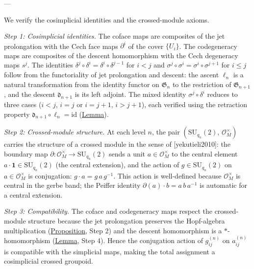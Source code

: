 \begin{proposition}
---

We verify the cosimplicial identities and the crossed-module axioms.

\emph{Step 1: Cosimplicial identities.}
The coface maps are composites of the jet prolongation with the
Cech face maps $\partial^i$ of the cover $\{U_i\}$.  The
codegeneracy maps are composites of the descent homomorphism with the
Cech degeneracy maps $s^j$.  The identities
$\delta^j \circ \delta^i = \delta^i \circ \delta^{j-1}$ for $i < j$
and $\sigma^j \circ \sigma^i = \sigma^i \circ \sigma^{j+1}$ for $i \leq j$
follow from the functoriality of jet prolongation and descent: the ascent
$\ell_n$ is a natural transformation from the identity functor on
$\mathfrak{G}_n$ to the restriction of $\mathfrak{G}_{n+1}$, and the
descent $\mathfrak{d}_{n+1}$ is its left adjoint.  The mixed identity
$\sigma^j \circ \delta^i$ reduces to three cases
($i < j$, $i = j$ or $i = j + 1$, $i > j + 1$), each verified using
the retraction property $\mathfrak{d}_{n+1} \circ \ell_n = \mathrm{id}$
(\hyperref[lem:descent]{Lemma}).

\emph{Step 2: Crossed-module structure.}
At each level $n$, the pair
$(\mathrm{SU}_{q_n}(2),\, \mathcal{O}_M^{\times})$ carries the structure
of a crossed module in the sense of [yekutieli2010]: the boundary
map $\partial \colon \mathcal{O}_M^{\times} \to \mathrm{SU}_{q_n}(2)$
sends a unit $a \in \mathcal{O}_M^{\times}$ to the central element
$a \cdot \mathbf{1} \in \mathrm{SU}_{q_n}(2)$ (the central extension),
and the action of $g \in \mathrm{SU}_{q_n}(2)$ on
$a \in \mathcal{O}_M^{\times}$ is conjugation:
$g \cdot a = g\, a\, g^{-1}$.  This action is well-defined because
$\mathcal{O}_M^{\times}$ is central in the gerbe band; the Peiffer
identity $\partial(a) \cdot b = a\, b\, a^{-1}$ is automatic for a
central extension.

\emph{Step 3: Compatibility.}
The coface and codegeneracy maps respect the crossed-module structure
because the jet prolongation preserves the Hopf-algebra multiplication
(\hyperref[prop:jet-prolongation]{Proposition}, Step 2) and the descent
homomorphism is a $*$-homomorphism (\hyperref[lem:descent]{Lemma}, Step 4).
Hence the conjugation action of $g_{ij}^{(n)}$ on $a_{ij}^{(n)}$ is
compatible with the simplicial maps, making the total assignment a
cosimplicial crossed groupoid.
\end{proposition}
